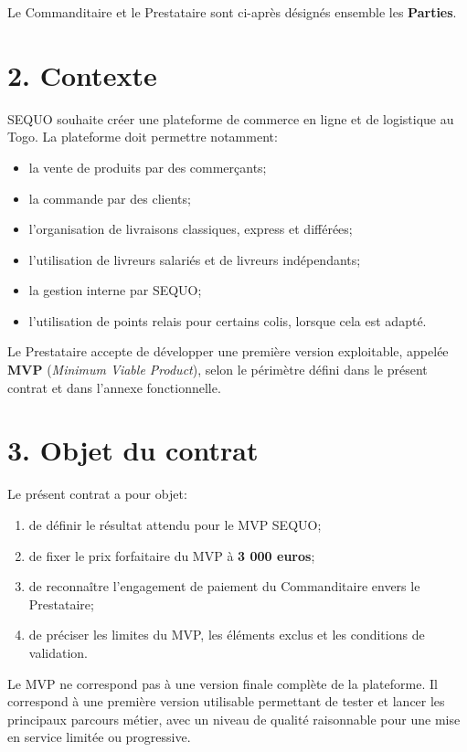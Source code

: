 \documentclass[11pt,a4paper]{article}
\begin{document}
Le Commanditaire et le Prestataire sont ci-après désignés ensemble les \textbf{Parties}.

\section*{2. Contexte}

SEQUO souhaite créer une plateforme de commerce en ligne et de logistique au Togo. La plateforme doit permettre notamment:

\begin{itemize}
    \item la vente de produits par des commerçants;
    \item la commande par des clients;
    \item l'organisation de livraisons classiques, express et différées;
    \item l'utilisation de livreurs salariés et de livreurs indépendants;
    \item la gestion interne par SEQUO;
    \item l'utilisation de points relais pour certains colis, lorsque cela est adapté.
\end{itemize}

Le Prestataire accepte de développer une première version exploitable, appelée \textbf{MVP} (\textit{Minimum Viable Product}), selon le périmètre défini dans le présent contrat et dans l'annexe fonctionnelle.

\section*{3. Objet du contrat}

Le présent contrat a pour objet:

\begin{enumerate}
    \item de définir le résultat attendu pour le MVP SEQUO;
    \item de fixer le prix forfaitaire du MVP à \textbf{3 000 euros};
    \item de reconnaître l'engagement de paiement du Commanditaire envers le Prestataire;
    \item de préciser les limites du MVP, les éléments exclus et les conditions de validation.
\end{enumerate}

Le MVP ne correspond pas à une version finale complète de la plateforme. Il correspond à une première version utilisable permettant de tester et lancer les principaux parcours métier, avec un niveau de qualité raisonnable pour une mise en service limitée ou progressive.
\end{document}
